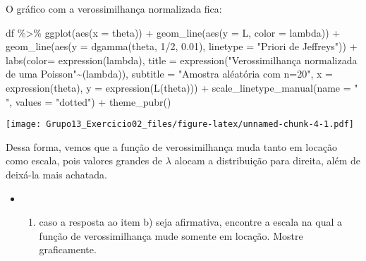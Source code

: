 \documentclass[
]{article}
\newenvironment{Shaded}{\begin{snugshade}}{\end{snugshade}}
\newcommand{\AttributeTok}[1]{\textcolor[rgb]{0.77,0.63,0.00}{#1}}
\newcommand{\DecValTok}[1]{\textcolor[rgb]{0.00,0.00,0.81}{#1}}
\newcommand{\FloatTok}[1]{\textcolor[rgb]{0.00,0.00,0.81}{#1}}
\newcommand{\FunctionTok}[1]{\textcolor[rgb]{0.00,0.00,0.00}{#1}}
\newcommand{\NormalTok}[1]{#1}
\newcommand{\SpecialCharTok}[1]{\textcolor[rgb]{0.00,0.00,0.00}{#1}}
\newcommand{\StringTok}[1]{\textcolor[rgb]{0.31,0.60,0.02}{#1}}
\providecommand{\tightlist}{%
  \setlength{\itemsep}{0pt}\setlength{\parskip}{0pt}}
\begin{document}
O gráfico com a verossimilhança normalizada fica:

\begin{Shaded}
\begin{Highlighting}[]
\NormalTok{df }\SpecialCharTok{\%\textgreater{}\%}  \FunctionTok{ggplot}\NormalTok{(}\FunctionTok{aes}\NormalTok{(}\AttributeTok{x =}\NormalTok{ theta)) }\SpecialCharTok{+} \FunctionTok{geom\_line}\NormalTok{(}\FunctionTok{aes}\NormalTok{(}\AttributeTok{y =}\NormalTok{ L, }\AttributeTok{color =}\NormalTok{ lambda)) }\SpecialCharTok{+}
  \FunctionTok{geom\_line}\NormalTok{(}\FunctionTok{aes}\NormalTok{(}\AttributeTok{y =} \FunctionTok{dgamma}\NormalTok{(theta, }\DecValTok{1}\SpecialCharTok{/}\DecValTok{2}\NormalTok{, }\FloatTok{0.01}\NormalTok{), }\AttributeTok{linetype =} \StringTok{"Priori de Jeffreys"}\NormalTok{)) }\SpecialCharTok{+}
  \FunctionTok{labs}\NormalTok{(}\AttributeTok{color=} \FunctionTok{expression}\NormalTok{(lambda), }
       \AttributeTok{title =} \FunctionTok{expression}\NormalTok{(}\StringTok{"Verossimilhança normalizada de uma Poisson"}\SpecialCharTok{\textasciitilde{}}\NormalTok{(lambda)),}
       \AttributeTok{subtitle =} \StringTok{"Amostra aléatória com n=20"}\NormalTok{,}
       \AttributeTok{x =} \FunctionTok{expression}\NormalTok{(theta),}
       \AttributeTok{y =} \FunctionTok{expression}\NormalTok{(}\FunctionTok{L}\NormalTok{(theta))) }\SpecialCharTok{+}
  \FunctionTok{scale\_linetype\_manual}\NormalTok{(}\AttributeTok{name =} \StringTok{" "}\NormalTok{, }\AttributeTok{values =} \StringTok{"dotted"}\NormalTok{) }\SpecialCharTok{+}
  \FunctionTok{theme\_pubr}\NormalTok{()}
\end{Highlighting}
\end{Shaded}

\texttt{[image: Grupo13\_Exercicio02\_files/figure-latex/unnamed-chunk-4-1.pdf]}

Dessa forma, vemos que a função de verossimilhança muda tanto em locação
como escala, pois valores grandes de \(\lambda\) alocam a distribuição
para direita, além de deixá-la mais achatada.

\begin{itemize}
\item
  \begin{enumerate}
  \def\labelenumi{\alph{enumi})}
  \setcounter{enumi}{2}
  \tightlist
  \item
    caso a resposta ao item b) seja afirmativa, encontre a escala na
    qual a função de verossimilhança mude somente em locação. Mostre
    graficamente.
  \end{enumerate}
\end{itemize}
\end{document}
